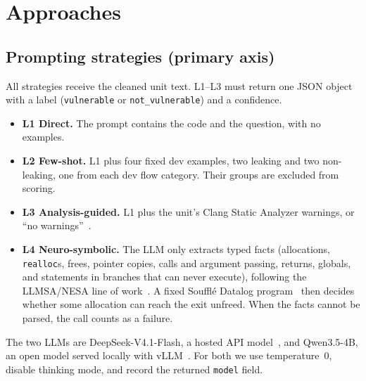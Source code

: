 \documentclass[conference]{IEEEtran}
\newcommand{\code}[1]{\texttt{#1}}
\begin{document}
\section{Approaches}
\label{sec:approaches}
\subsection{Prompting strategies (primary axis)}
All strategies receive the cleaned unit text. L1--L3 must return one JSON object with a label (\code{vulnerable} or \code{not\_vulnerable}) and a confidence. %
\begin{itemize}
\item \textbf{L1 Direct.} The prompt contains the code and the question, with no examples.
\item \textbf{L2 Few-shot.} L1 plus four fixed dev examples, two leaking and two non-leaking, one from each dev flow category. Their groups are excluded from scoring. %
\item \textbf{L3 Analysis-guided.} L1 plus the unit's Clang Static Analyzer warnings, or ``no warnings''~\cite{clangsa,wen2024llm4sa}.
\item \textbf{L4 Neuro-symbolic.} The LLM only extracts typed facts (allocations, \code{realloc}s, frees, pointer copies, calls and argument passing, returns, globals, and statements in branches that can never execute), following the LLMSA/NESA line of work~\cite{wang2024nesa,wang2024llmdfa}. A fixed Soufflé Datalog program~\cite{jordan2016souffle} then decides whether some allocation can reach the exit unfreed. When the facts cannot be parsed, the call counts as a failure.
\end{itemize}
The two LLMs are DeepSeek-V4.1-Flash, a hosted API model~\cite{deepseekpricing}, and Qwen3.5-4B, an open model served locally with vLLM~\cite{qwen35,kwon2023vllm}.
For both we use temperature~0, disable thinking mode, and record the returned \code{model} field.
\end{document}
